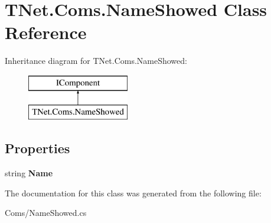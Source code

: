 \hypertarget{class_t_net_1_1_coms_1_1_name_showed}{}\section{T\+Net.\+Coms.\+Name\+Showed Class Reference}
\label{class_t_net_1_1_coms_1_1_name_showed}
Inheritance diagram for T\+Net.\+Coms.\+Name\+Showed\+:\begin{figure}[H]
\begin{center}
\leavevmode
\includegraphics[height=2.000000cm]{class_t_net_1_1_coms_1_1_name_showed}
\end{center}
\end{figure}
\subsection*{Properties}
\begin{DoxyCompactItemize}
\item 
\mbox{\label{class_t_net_1_1_coms_1_1_name_showed_a546252967f99002ed7e6044cb6128622}} 
string {\bfseries Name}
\end{DoxyCompactItemize}


The documentation for this class was generated from the following file\+:\begin{DoxyCompactItemize}
\item 
Coms/Name\+Showed.\+cs\end{DoxyCompactItemize}
